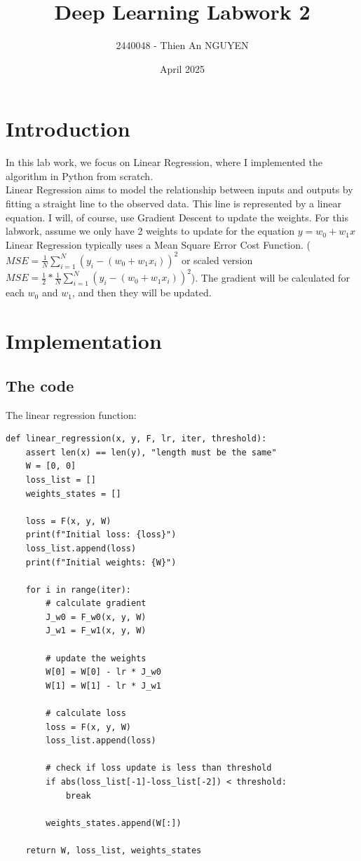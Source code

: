 \documentclass{article}
\title{Deep Learning Labwork 2}
\author{2440048 - Thien An NGUYEN}
\date{April 2025}
\begin{document}
\maketitle

\section{Introduction}
In this lab work, we focus on Linear Regression, where I implemented the algorithm in Python from scratch.\\
\noindent Linear Regression aims to model the relationship between inputs and outputs by fitting a straight line to the observed data. This line is represented by a linear equation. I will, of course, use Gradient Descent to update the weights. For this labwork, assume we only have 2 weights to update for the equation $y = w_0 + w_1x$\\
\noindent Linear Regression typically uses a Mean Square Error Cost Function. ($MSE = \frac{1}{N} \sum_{i=1}^{N} (y_i - (w_0 + w_1 x_i))^2$ or scaled version $MSE = \frac{1}{2}* \frac{1}{N} \sum_{i=1}^{N} (y_i - (w_0 + w_1 x_i))^2$). The gradient will be calculated for each $w_0$ and $w_1$, and then they will be updated.

\section{Implementation}
\subsection{The code}
The linear regression function:
\begin{verbatim}
def linear_regression(x, y, F, lr, iter, threshold):
    assert len(x) == len(y), "length must be the same"
    W = [0, 0]
    loss_list = []
    weights_states = []

    loss = F(x, y, W)
    print(f"Initial loss: {loss}")
    loss_list.append(loss)
    print(f"Initial weights: {W}")

    for i in range(iter):
        # calculate gradient
        J_w0 = F_w0(x, y, W)
        J_w1 = F_w1(x, y, W)

        # update the weights
        W[0] = W[0] - lr * J_w0
        W[1] = W[1] - lr * J_w1

        # calculate loss
        loss = F(x, y, W)
        loss_list.append(loss)

        # check if loss update is less than threshold
        if abs(loss_list[-1]-loss_list[-2]) < threshold:
            break

        weights_states.append(W[:])
    
    return W, loss_list, weights_states
\end{verbatim}
\end{document}
